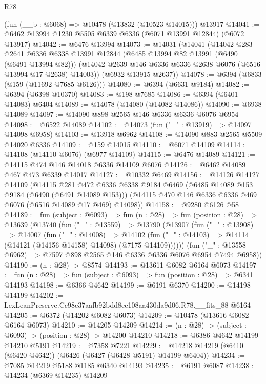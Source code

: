 \begin{lexlean}{R78}
\begin{coremodule}
    (fun (__b : @6068) => @10478 (@13832 (@10523 @14015)))
    @13917
@14041 := @6462 @13994 @1230 @5505 @6339 @6336 (@6071 @13991 @12844) (@6072 @13917)
@14042 := @6476 @13994
@14073 := @14031
    (@14041
      (@14042
        @283
        @2641
        @6336
        @6338
        @13991
        @12844
        (@6485 @13994 @82 @13991 (@6490 (@6491 @13994 @82)))
        (@14042 @2639 @146 @6336 @6336 @2638 @6076 (@6516 @13994 @17 @2638) @14003))
      (@6932 @13915 @2637))
@14078 := @6394 (@6833 (@159 (@11692 @7685 @6126)))
@14080 := @6394 (@6631 @9184)
@14082 := @6394 (@6398 @10370)
@14083 := @198 @7685
@14086 := @6394 (@6401 @14083) @6404
@14089 := @14078 (@14080 (@14082 @14086))
@14090 := @6938 @14089
@14097 := @14090 @898 @2565 @146 @6336 @6336 @6076 @6954
@14098 := @6522 @14089
@14102 := @14073 (fun ("_" : @13919) => @14097 @14098 @6958)
@14103 := @13918 @6962
@14108 := @14090 @883 @2565 @5509 @14020 @6336
@14109 := @159 @14015
@14110 := @6071 @14109
@14114 := @14108 (@14110 @6076) (@6977 @14109)
@14115 := @6476 @14089
@14121 := @14115 @474 @146 @14018 @6336 @14109 @6076
@14126 := @6462 @14089 @467 @473 @6339 @14017
@14127 := @10332 @6469
@14156 := @14126
    @14127
    @14109
    (@14115
      @281
      @472
      @6336
      @6338
      @9184
      @6469
      (@6485 @14089 @153 @9184 (@6490 (@6491 @14089 @153)))
      (@14115 @470 @146 @6336 @6336 @469 @6076 (@6516 @14089 @17 @469) @14098))
@14158 := @9280 @6126 @58
@14189 := fun (subject : @6093) =>
  fun (n : @28) =>
  fun (position : @28) =>
  @13639
    (@13740
      (fun ("_" : @13559) =>
      @13790
        (@13907
          (fun ("_" : @13908) =>
          @14007
            (fun ("_" : @14008) =>
            @14102 (fun ("_" : @14103) => @14114 (@14121 (@14156 @14158) @14098) (@7175 @14109))))))
      (fun ("_" : @13558 @6962) => @7597 @898 @2565 @146 @6336 @6336 @6076 @6954 @7494 @6958))
@14190 := (n : @28) -> @8574
@14193 := @13611 @6082 @6164 @6073
@14197 := fun (n : @28) => fun (subject : @6093) => fun (position : @28) => @6341 @14193
@14198 := @6366 @4642
@14199 := @6191 @6370
@14200 := @14198 @14199
@14202 := LexLeanPreserve.Cc98c37aafb92bdd8ec108aa430da9d06.R78.__fits_88 @6164
@14205 := @6372 (@14202 @6082 @6073)
@14209 := @10478 (@13616 @6082 @6164 @6073)
@14210 := @14205 @14209
@14214 := (n : @28) -> (subject : @6093) -> (position : @28) -> @14200 @14210
@14218 := @6386 @4642 @14199 @14210 @5191
@14219 := @7358 @7221
@14229 := @14218 @14219 (@6410 (@6420 @4642)) (@6426 (@6427 (@6428 @5191) @14199 @6404))
@14234 := @7085 @14219 @5188 @1185 @6340 @14193
@14235 := @6191 @6087
@14238 := @14234 (@6369 @14235) @14209

\end{coremodule}
\end{lexlean}
